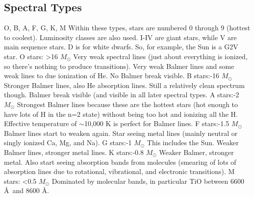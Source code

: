 \subsection{Spectral Types}
O, B, A, F, G, K, M\newline
Within these types, stars are numbered 0 through 9 (hottest to coolest).  Luminosity classes 
are also used.  I-IV are giant stars, while V are main sequence stars.  D is for white dwarfs.  
So, for example, the Sun is a G2V star.\newline
O stars:\newline
>16 $M_{\odot}$\newline
Very weak spectral lines (just about everything is ionized, so there's nothing 
to produce transitions).  Very weak Balmer lines and some weak lines to due 
ionization of He.  No Balmer break visible.\newline
B stars:-16 $M_{\odot}$\newline
Stronger Balmer lines, also He absorption lines.  Still a relatively clean 
spectrum though.  Balmer break visible (and visible in all later spectral 
types.\newline
A stars:-2 $M_{\odot}$\newline
Strongest Balmer lines because these are the hottest stars (hot enough to have 
lots of H in the n=2 state) without being too hot and ionizing all the H.  
Effective temperature of $\sim$10,000 K is perfect for Balmer lines.\newline
F stars:-1.5 $M_{\odot}$\newline
Balmer lines start to weaken again.  Star seeing metal lines (mainly neutral 
or singly ionized Ca, Mg, and Na).\newline
G stars:-1 $M_{\odot}$\newline
This includes the Sun.  Weaker Balmer lines, stronger metal lines.\newline
K stars:-0.8 $M_{\odot}$\newline
Weaker Balmer, stronger metal.  Also start seeing absorption bands from 
molecules (smearing of lots of absorption lines due to rotational, vibrational, 
and electronic transitions).
M stars:\newline
<0.5 $M_{\odot}$\newline
Dominated by molecular bands, in particular TiO between 6600 \AA\ and 8600 \AA.


